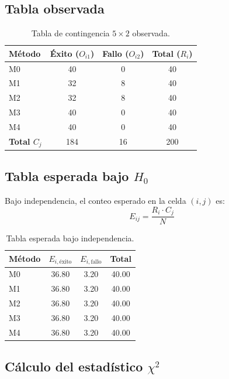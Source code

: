 \documentclass[12pt,a4paper,oneside]{book}
\begin{document}
\subsection{Tabla observada}

\begin{table}[H]
\centering
\caption{Tabla de contingencia $5\times 2$ observada.}
\renewcommand{\arraystretch}{1.3}
\begin{tabular}{lccc}
\toprule
\textbf{Método} & \textbf{Éxito ($O_{i1}$)} & \textbf{Fallo ($O_{i2}$)} & \textbf{Total ($R_i$)} \\
\midrule
M0 & 40 & 0 & 40 \\
M1 & 32 & 8 & 40 \\
M2 & 32 & 8 & 40 \\
M3 & 40 & 0 & 40 \\
M4 & 40 & 0 & 40 \\
\midrule
\textbf{Total $C_j$} & 184 & 16 & 200 \\
\bottomrule
\end{tabular}
\end{table}

\subsection{Tabla esperada bajo $H_0$}

Bajo independencia, el conteo esperado en la celda $(i,j)$ es:
\begin{equation}
E_{ij} = \frac{R_i \cdot C_j}{N}
\end{equation}

\begin{table}[H]
\centering
\caption{Tabla esperada bajo independencia.}
\renewcommand{\arraystretch}{1.3}
\begin{tabular}{lccc}
\toprule
\textbf{Método} & \textbf{$E_{i,\text{éxito}}$} & \textbf{$E_{i,\text{fallo}}$} & \textbf{Total} \\
\midrule
M0 & 36.80 & 3.20 & 40.00 \\
M1 & 36.80 & 3.20 & 40.00 \\
M2 & 36.80 & 3.20 & 40.00 \\
M3 & 36.80 & 3.20 & 40.00 \\
M4 & 36.80 & 3.20 & 40.00 \\
\bottomrule
\end{tabular}
\end{table}

\subsection{Cálculo del estadístico $\chi^2$}
\end{document}
